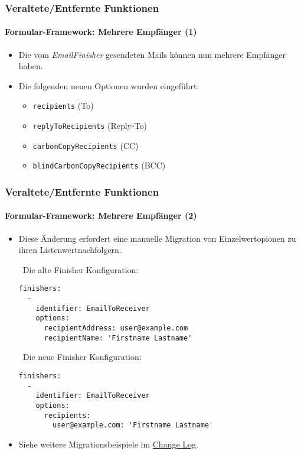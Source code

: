\begin{frame}[fragile]
	\frametitle{Veraltete/Entfernte Funktionen}
	\framesubtitle{Formular-Framework: Mehrere Empfänger (1)}

	\begin{itemize}
		\item Die vom \textit{EmailFinisher} gesendeten Mails können nun mehrere Empfänger haben.

		\item Die folgenden neuen Optionen wurden eingeführt:

			\begin{itemize}
				\item \texttt{recipients} (To)
				\item \texttt{replyToRecipients} (Reply-To)
				\item \texttt{carbonCopyRecipients} (CC)
				\item \texttt{blindCarbonCopyRecipients} (BCC)
			\end{itemize}

	\end{itemize}

\end{frame}


\begin{frame}[fragile]
	\frametitle{Veraltete/Entfernte Funktionen}
	\framesubtitle{Formular-Framework: Mehrere Empfänger (2)}

	\lstset{basicstyle=\tiny\ttfamily}

	\begin{itemize}
		\item Diese Änderung erfordert eine manuelle Migration von Einzelwertopionen zu ihren Listenwertnachfolgern.

		\smaller\ Die alte Finisher Konfiguration:\normalsize

\begin{lstlisting}
finishers:
  -
    identifier: EmailToReceiver
    options:
      recipientAddress: user@example.com
      recipientName: 'Firstname Lastname'
\end{lstlisting}

		\smaller\ Die neue Finisher Konfiguration:\normalsize

\begin{lstlisting}
finishers:
  -
    identifier: EmailToReceiver
    options:
      recipients:
        user@example.com: 'Firstname Lastname'
\end{lstlisting}

		\item Siehe weitere Migrationsbeispiele im \href{https://docs.typo3.org/c/typo3/cms-core/10.0/en-us/Changelog/master/Deprecation-80420-EmailFinisherSingleAddressOptions.html}{Change Log}.

	\end{itemize}

\end{frame}

